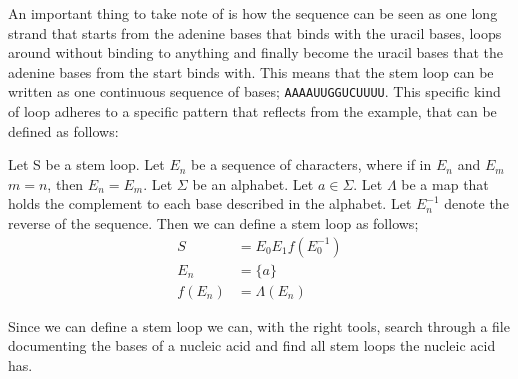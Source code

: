 An important thing to take note of is how the sequence can be seen as one 
long strand that starts from the adenine bases that binds with the uracil bases, 
loops around without binding to anything and finally become the uracil bases 
that the adenine bases from the start binds with. This means that the 
stem loop can be written as one continuous sequence of bases; {\tt AAAAUUGGUCUUUU}. 
This specific kind of loop adheres to a specific pattern that reflects from 
the example, that can be defined as follows:
\begin{mydef}
\centering
Let S be a stem loop. Let $E_n$ be a sequence of characters, where if in $E_n$ 
and $E_m$ $m = n$, then $E_n =E_m$. Let $\Sigma$ be an alphabet. Let 
$a \in \Sigma$. Let $\Lambda$ be a map that holds the complement to each base 
described in the alphabet. Let $E_n^{-1}$
denote the reverse of the sequence. Then we can define a stem loop as follows;
\begin{align*}
S      &= E_0 E_1 f(E_0^{-1}) \\
E_n    &= \{a\}\\
f(E_n) &= \Lambda(E_n)
\end{align*}
\end{mydef}
Since we can define a stem loop we can, with the right tools, search through 
a file documenting the bases of a nucleic acid and find all stem loops 
the nucleic acid has.

